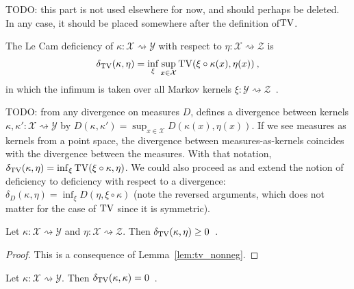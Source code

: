 TODO: this part is not used elsewhere for now, and should perhaps be deleted.
In any case, it should be placed somewhere after the definition of$\operatorname{TV}$.

\begin{definition}
  \label{def:deficiency}
  The Le Cam deficiency of $\kappa : \mathcal X \rightsquigarrow \mathcal Y$ with respect to $\eta : \mathcal X \rightsquigarrow \mathcal Z$ is
  \begin{align*}
  \delta_{\operatorname{TV}}(\kappa, \eta) = \inf_{\xi} \sup_{x \in \mathcal X} \operatorname{TV}(\xi \circ \kappa (x), \eta(x)) \: ,
  \end{align*}
  in which the infimum is taken over all Markov kernels $\xi : \mathcal Y \rightsquigarrow \mathcal Z$~.
\end{definition}

TODO: from any divergence on measures $D$, \cite{perrone2023markov} defines a divergence between kernels $\kappa, \kappa' : \mathcal X \rightsquigarrow \mathcal Y$ by $D(\kappa, \kappa') = \sup_{x \in \mathcal X} D(\kappa(x), \eta(x))$.
If we see measures as kernels from a point space, the divergence between measures-as-kernels coincides with the divergence between the measures.
With that notation, $\delta_{\operatorname{TV}}(\kappa, \eta) = \inf_{\xi} \operatorname{TV}(\xi \circ \kappa, \eta)$.
We could also proceed as \cite{raginsky2011shannon} and extend the notion of deficiency to deficiency with respect to a divergence: $\delta_D(\kappa, \eta) = \inf_{\xi} D(\eta, \xi\circ\kappa)$ (note the reversed arguments, which does not matter for the case of $\operatorname{TV}$ since it is symmetric).

\begin{lemma}
  \label{lem:deficiency_nonneg}
  Let $\kappa: \mathcal X \rightsquigarrow \mathcal Y$ and $\eta : \mathcal X \rightsquigarrow \mathcal Z$. Then $\delta_{\operatorname{TV}}(\kappa, \eta) \ge 0$~.
\end{lemma}

\begin{proof}%
{}
This is a consequence of Lemma~\ref{lem:tv_nonneg}.
\end{proof}

\begin{lemma}
  \label{lem:deficiency_self}
  Let $\kappa: \mathcal X \rightsquigarrow \mathcal Y$. Then $\delta_{\operatorname{TV}}(\kappa, \kappa) = 0$~.
\end{lemma}

